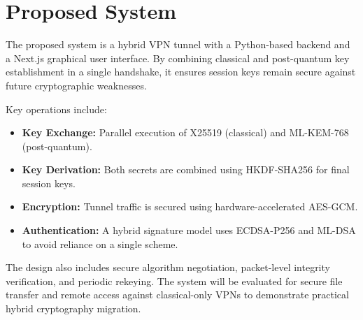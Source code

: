 \section{Proposed System}
The proposed system is a hybrid VPN tunnel with a Python-based backend and a Next.js graphical user interface. By combining classical and post-quantum key establishment in a single handshake, it ensures session keys remain secure against future cryptographic weaknesses.

Key operations include:
\begin{itemize}
    \item \textbf{Key Exchange:} Parallel execution of X25519 (classical) and ML-KEM-768 (post-quantum).
    \item \textbf{Key Derivation:} Both secrets are combined using HKDF-SHA256 for final session keys.
    \item \textbf{Encryption:} Tunnel traffic is secured using hardware-accelerated AES-GCM.
    \item \textbf{Authentication:} A hybrid signature model uses ECDSA-P256 and ML-DSA to avoid reliance on a single scheme.
\end{itemize}

The design also includes secure algorithm negotiation, packet-level integrity verification, and periodic rekeying. The system will be evaluated for secure file transfer and remote access against classical-only VPNs to demonstrate practical hybrid cryptography migration.
